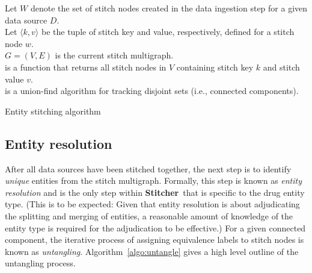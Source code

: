 \documentclass{bioinfo}
\newcommand\st{\textbf{Stitcher}}
\begin{document}
\begin{methods}
\begin{algorithm}\label{algo:stitching}
\SetAlgoLined
\DontPrintSemicolon
Let $W$ denote the set of stitch nodes created in the data ingestion
step for a given data source $D$.\\
Let $\langle k, v\rangle$ be the tuple of stitch key and value,
respectively, defined for a stitch node $w$.\\
$G=(V,E)$ is the current stitch multigraph.\\
 is a function that returns all stitch nodes in $V$
containing stitch key $k$ and stitch value $v$.\\
 is a union-find algorithm for tracking disjoint sets
(i.e., connected components).\\
 \caption{Entity stitching algorithm}
\end{algorithm}

\subsection{Entity resolution}\label{sec:methods-er}
After all data sources have been stitched together, the next step is
to identify \emph{unique} entities from the stitch multigraph. Formally, this
step is known as \emph{entity resolution} and is the only step
within \st\ that is specific to the drug entity type. (This is to be
expected: Given that entity resolution is about adjudicating
the splitting and merging of entities, a reasonable amount of
knowledge of the entity type is required for the adjudication to be
effective.) For a given connected component, the iterative process of
assigning equivalence labels to stitch nodes is known
as \emph{untangling}. Algorithm~\ref{algo:untangle} gives a high level
outline of the untangling process.


\end{methods}
\end{document}
